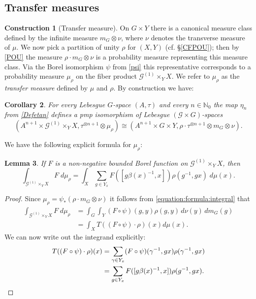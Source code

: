 \documentclass[11pt, oneside]{amsart}
\newtheorem{lemma}{Lemma}[section]
\newtheorem{cor}[lemma]{Corollary}
\theoremstyle{definition}
\newtheorem{con}[lemma]{Construction}
\theoremstyle{remark}
\theoremstyle{TheoremNum}
\newcommand{\cG}{\mathcal{G}}
\begin{document}
\subsection{Transfer measures}\label{sec:trans:meas}
\begin{con}[Transfer measure] On $G \times Y$ there is a canonical measure class defined by the infinite measure $m_G \otimes \nu$, where $\nu$ denotes the transverse measure of $\mu$. We now pick a partition of unity $\rho$ for $(X,Y)$ (cf. \S \ref{CFPOU}); then by \eqref{POU} the measure $\rho \cdot m_G \otimes \nu$ is a probability measure representing this measure class. Via the Borel isomorphism $\psi$ from \eqref{psi} this representative corresponds to a probability measure  $\mu_\rho$ on the fiber product $\mathcal{G}^{(1)} \times_Y X$. We refer to $\mu_\rho$ as the \emph{transfer measure} defined by $\mu$ and $\rho$. By construction we have:
\end{con}
 \begin{cor}\label{CorEta1} For every Lebesgue $G$-space $(A, \tau)$ and every $n \in \mathbb N_0$ the map $\eta_n$ from \eqref{Defetan} defines a pmp isomorphism of Lebesgue $(\cG \times G)$-spaces
 \[
  (A^{n+1}\times \mathcal{G}^{(1)}\times_Y X, \tau^{\otimes n+1} \otimes {\mu}_\rho) \cong (A^{n+1}\times G\times Y , \rho \cdot \tau^{\otimes n+1} \otimes m_G \otimes \nu).
 \]
 \end{cor}
 We have the following explicit formula for $\mu_\rho$:
\begin{lemma}\label{murho} If $F$ is a non-negative bounded Borel function on $\mathcal{G}^{(1)} \times_Y X$, then
 \[
 \int_{\mathcal{G}^{(1)} \times_Y X} F \; d{\mu}_\rho = \int_X \sum_{g \in Y_x} F([g\beta(x)^{-1}, x])   \rho(g^{-1}, gx)\; d \mu(x).
 \]
 \end{lemma}
 \begin{proof} Since $\mu_\rho =  \psi_*(\rho \cdot m_G\otimes \nu)$ it follows from \eqref{equation:formula:integral} that
 \begin{align*}
  \int_{\mathcal{G}^{(1)} \times_Y X} F\; d\mu_{\rho} &= \int_{G} \int_Y (F \circ\psi)(g,y) \rho(g,y) \, d \nu(y) \, d m_G(g)\\
  &= \int_X T((F \circ \psi) \cdot \rho)(x) d\mu(x).
 \end{align*}
 We can now write out the integrand explicitly:
 \begin{align*}
 T((F \circ \psi) \cdot \rho)(x) &=  \sum_{\gamma \in Y_x}(F \circ \psi)(\gamma^{-1}, gx) \rho(\gamma^{-1}, gx)\\
 &= \sum_{g \in Y_x}  F([g \beta(x)^{-1} ,x])  \rho(g^{-1}, gx).\qedhere
 \end{align*}
 \end{proof}
\end{document}
